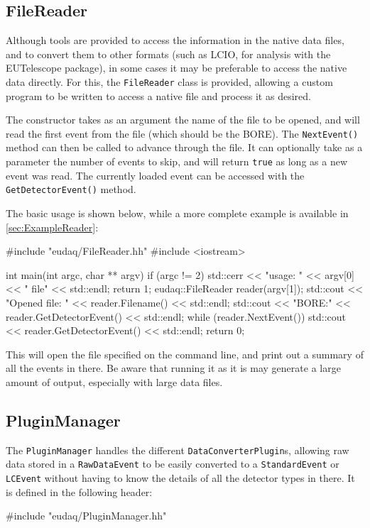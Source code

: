 \subsection{FileReader}
Although tools are provided to access the information in the native data files,
and to convert them to other formats (such as LCIO, for analysis with the EUTelescope package),
in some cases it may be preferable to access the native data directly.
For this, the \texttt{FileReader} class is provided,
allowing a custom program to be written to access a native file and process it as desired.

The constructor takes as an argument the name of the file to be opened,
and will read the first event from the file (which should be the \gls{BORE}).
The \texttt{NextEvent()} method can then be called to advance through the file.
It can optionally take as a parameter the number of events to skip,
and will return \texttt{true} as long as a new event was read.
The currently loaded event can be accessed with the \texttt{GetDetectorEvent()} method.

The basic usage is shown below, while a more complete example is available in \autoref{sec:ExampleReader}:
\begin{listing}
#include "eudaq/FileReader.hh"
#include <iostream>

int main(int argc, char ** argv) {
  if (argc != 2) {
    std::cerr << "usage: " << argv[0] << " file" << std::endl;
    return 1;
  }
  eudaq::FileReader reader(argv[1]);
  std::cout << "Opened file: " << reader.Filename() << std::endl;
  std::cout << "BORE:\n" << reader.GetDetectorEvent() << std::endl;
  while (reader.NextEvent()) {
    std::cout << reader.GetDetectorEvent() << std::endl;
  }
  return 0;
}
\end{listing}

This will open the file specified on the command line,
and print out a summary of all the events in there.
Be aware that running it as it is may generate a large amount of output,
especially with large data files.

\subsection{PluginManager}\label{sec:PluginManager}
The \texttt{PluginManager} handles the different \texttt{DataConverterPlugin}s,
allowing raw data stored in a \texttt{RawDataEvent} to be easily converted
to a \texttt{StandardEvent} or \texttt{LCEvent} without having to know the details of all the detector types in there.
It is defined in the following header:
\begin{listing}
#include "eudaq/PluginManager.hh"
\end{listing}

